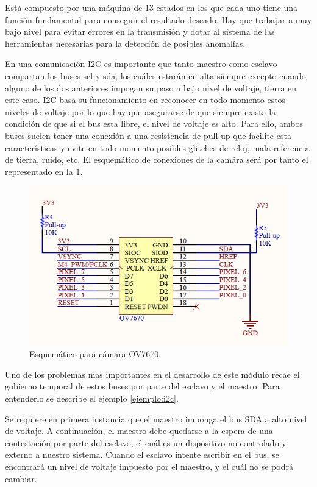 Está compuesto por una máquina de 13 estados en los que cada uno tiene una función fundamental para conseguir el resultado deseado. Hay que trabajar a muy bajo nivel para evitar errores en la transmisión y dotar al sistema de las herramientas necesarias para la detección de posibles anomalías.

En una comunicación I2C es importante que tanto maestro como esclavo compartan los buses scl y sda, los cuáles estarán en alta siempre excepto cuando alguno de los dos anteriores impogan su paso a bajo nivel de voltaje, tierra en este caso. I2C basa su funcionamiento en reconocer en todo momento estos niveles de voltaje por lo que hay que asegurarse de que siempre exista la condición de que si el bus esta libre, el nivel de voltaje es alto. Para ello, ambos buses suelen tener una conexión a una resistencia de pull-up que facilite esta características y evite en todo momento posibles glitches de reloj, mala referencia de tierra, ruido, etc. El esquemático de conexiones de la camára será por tanto el representado en la \ref{fig:OV7670_schematic}.

\begin{figure}[H]
	\center
	\includegraphics[scale=0.6, angle=0]{imagenes/Cuadricoptero_vision/OV7670_schematic}
	\caption{Esquemático para cámara OV7670.}
	\label{fig:OV7670_schematic}
\end{figure}

Uno de los problemas mas importantes en el desarrollo de este módulo recae el gobierno temporal de estos buses por parte del esclavo y el maestro. Para entenderlo se describe el ejemplo \ref{ejemplo:i2c}.

\begin{ejemplo}\label{ejemplo:i2c}
 Se requiere en primera instancia que el maestro imponga el bus SDA a alto nivel de voltaje.
 A continuación, el maestro debe quedarse a la espera de una contestación por parte del esclavo, el cuál es un dispositivo no controlado y externo a nuestro sistema. Cuando el esclavo intente escribir en el bus, se encontrará un nivel de voltaje impuesto por el maestro, y el cuál no se podrá cambiar.
\end{ejemplo}

